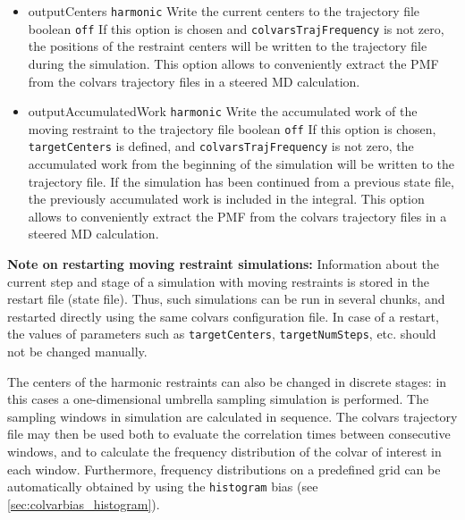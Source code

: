 \begin{itemize}
\item %
  \keydef
    {outputCenters}{%
    \texttt{harmonic}}{%
    Write the current centers to the trajectory file}{%
    boolean}{%
    \texttt{off}}{%
    If this option is chosen and  \texttt{colvarsTrajFrequency} is not zero, the positions of the restraint  centers will be written to the trajectory file during the simulation.
    This option allows to conveniently extract the PMF from the colvars trajectory files in a steered MD calculation.
}

\item %
  \keydef
    {outputAccumulatedWork}{%
    \texttt{harmonic}}{%
    Write the accumulated work of the moving restraint to the trajectory file}{%
    boolean}{%
    \texttt{off}}{%
    If this option is chosen, \texttt{targetCenters} is defined, and \texttt{colvarsTrajFrequency} is not zero, the accumulated work from the beginning of the simulation will be written to the trajectory file.
    If the simulation has been continued from a previous state file, the previously accumulated work is included in the integral.
    This option allows to conveniently extract the PMF from the colvars trajectory files in a steered MD calculation.
}

\end{itemize}

\textbf{Note on restarting moving restraint simulations:} Information
about the current step and stage of a simulation with moving restraints
is stored in the restart file (state file). Thus, such simulations can
be run in several chunks, and restarted directly using the same colvars
configuration file. In case of a restart, the values of parameters such
as \texttt{targetCenters}, \texttt{targetNumSteps}, etc. should not be
changed manually.


\label{sec:colvarbias_us}

The centers of the harmonic restraints can also be changed in discrete stages: in this cases a one-dimensional umbrella sampling simulation is performed.
The sampling windows in simulation are calculated in sequence.
The colvars trajectory file may then be used both to evaluate the correlation times between consecutive windows, and to calculate the frequency distribution of the colvar of interest in each window.
Furthermore, frequency distributions on a predefined grid can be automatically obtained by using the \texttt{histogram} bias (see \ref{sec:colvarbias_histogram}).

